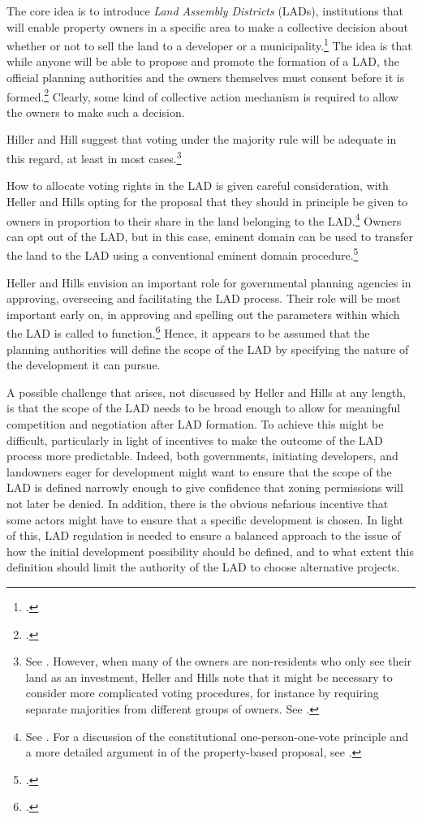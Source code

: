 The core idea is to introduce {\it Land Assembly Districts} (LADs), institutions that will enable property owners in a specific area to make a collective decision about whether or not to sell the land to a developer or a municipality.\footcite[1469-1470]{heller08} The idea is that while anyone will be able to propose and promote the formation of a LAD, the official planning authorities and the owners themselves must consent before it is formed.\footcite[1488-1489]{heller08} Clearly, some kind of collective action mechanism is required to allow the owners to make such a decision. 

Hiller and Hill suggest that voting under the majority rule will be adequate in this regard, at least in most cases.\footnote{See \cite[1496]{heller08}. However, when many of the owners are non-residents who only see their land as an investment, Heller and Hills note that it might be necessary to consider more complicated voting procedures, for instance by requiring separate majorities from different groups of owners. See \cite[1523-1524]{heller08}.} 

How to allocate voting rights in the LAD is given careful consideration, with Heller and Hills opting for the proposal that they should in principle be given to owners in proportion to their share in the land belonging to the LAD.\footnote{See \cite[1492]{heller08}. For a discussion of the constitutional one-person-one-vote principle and a more detailed argument in  of the property-based proposal, see \cite[1503-1507]{heller08}.} Owners can opt out of the LAD, but in this case, eminent domain can be used to transfer the land to the LAD using a conventional eminent domain procedure.\footcite[1496]{heller08}

Heller and Hills envision an important role for governmental planning agencies in approving, overseeing and facilitating the LAD process. Their role will be most important early on, in approving and spelling out the parameters within which the LAD is called to function.\footcite[1489-1491]{heller08} Hence, it appears to be assumed that the planning authorities will define the scope of the LAD by specifying the nature of the development it can pursue. 

A possible challenge that arises, not discussed by Heller and Hills at any length, is that the scope of the LAD needs to be broad enough to allow for meaningful competition and negotiation after LAD formation. To achieve this might be difficult, particularly in light of incentives to make the outcome of the LAD process more predictable. Indeed, both governments, initiating developers, and landowners eager for development might want to ensure that the scope of the LAD is defined narrowly enough to give confidence that zoning permissions will not later be denied. In addition, there is the obvious nefarious incentive that some actors might have to ensure that a specific development is chosen. In light of this, LAD regulation is needed to ensure a balanced approach to the issue of how the initial development possibility should be defined, and to what extent this definition should limit the authority of the LAD to choose alternative projects.


